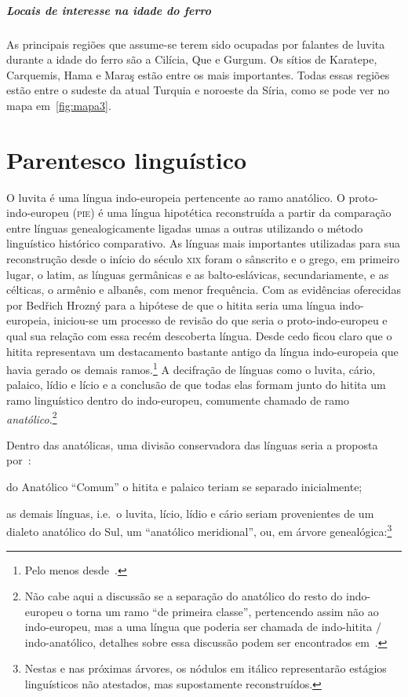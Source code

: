 \paragraph{Locais de interesse na idade do ferro}
As principais regiões que assume-se terem sido ocupadas por falantes de luvita
durante a idade do ferro são a Cilícia, Que e Gurgum.
Os sítios de Karatepe, Carquemis, Hama e Maraş estão entre os mais importantes.
Todas essas regiões estão entre o sudeste da atual Turquia e noroeste da Síria,
como se pode ver no mapa em~\autoref{fig:mapa3}.

\chapter{Parentesco linguístico}

O luvita é uma língua indo-europeia pertencente ao ramo anatólico.
O proto-indo-europeu (\textsc{pie}) é uma língua hipotética reconstruída a
partir da comparação entre línguas genealogicamente ligadas umas a outras
utilizando o método linguístico histórico comparativo.
As línguas mais importantes utilizadas para sua reconstrução desde o início do
século \textsc{xix} foram o sânscrito e o grego, em primeiro lugar, o latim, as
línguas germânicas e as balto-eslávicas, secundariamente, e as célticas,
o armênio e albanês, com menor frequência.
Com as evidências oferecidas por Bedřich Hrozný para a hipótese de que o
hitita seria uma língua indo-europeia, iniciou-se um processo de revisão do que
seria o proto-indo-europeu e qual sua relação com essa recém descoberta língua.
Desde cedo ficou claro que o hitita representava um destacamento bastante antigo
da língua indo-europeia que havia gerado os demais ramos.\footnote{Pelo menos
	desde~\citet{Sturtevant1933}.}
A decifração de línguas como o luvita, cário, palaico, lídio e lício e a
conclusão de que todas elas formam junto do hitita um ramo linguístico dentro do
indo-europeu, comumente chamado de ramo \emph{anatólico}.\footnote{Não cabe aqui
	a discussão se a separação do anatólico do resto do indo-europeu o torna um
	ramo ``de primeira classe'', pertencendo assim não ao indo-europeu, mas a uma
	língua que poderia ser chamada de indo-hitita \slash{} indo-anatólico,
	detalhes sobre essa discussão podem ser encontrados em~\citet{Ringue2017}.}

Dentro das anatólicas, uma divisão conservadora das línguas seria a proposta
por~\citet[305--6]{Rieken2017}:
\begin{inparaenum}
	\item do Anatólico ``Comum'' o hitita e palaico teriam se separado
	inicialmente;
	\item as demais línguas, i.e.\ o luvita, lício, lídio e cário seriam
	provenientes de um dialeto anatólico do Sul, um
	``anatólico meridional'', ou, em árvore genealógica:\footnote{Nestas e nas
		próximas árvores, os nódulos em itálico representarão estágios linguísticos
		não atestados, mas supostamente reconstruídos.}
\end{inparaenum}

